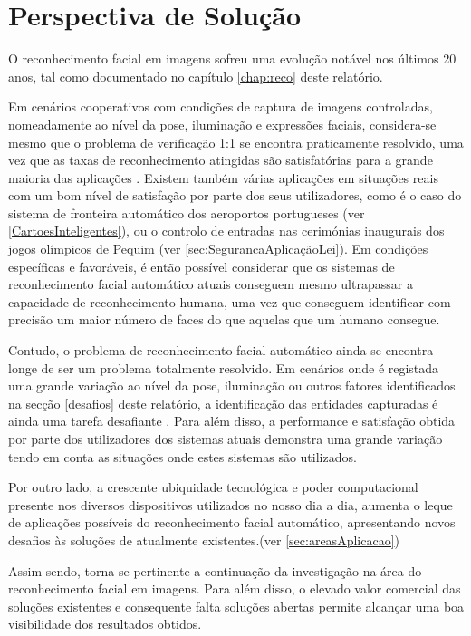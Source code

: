 \chapter{Perspectiva de Solução} \label{chap:solução}

O reconhecimento facial em imagens sofreu uma evolução notável nos últimos 20 anos, tal como documentado no capítulo \ref{chap:reco} deste relatório. 

Em cenários cooperativos com condições de captura de imagens controladas, nomeadamente ao nível da pose, iluminação e expressões faciais, considera-se mesmo que o problema de verificação 1:1 se encontra praticamente resolvido, uma vez que as taxas de reconhecimento atingidas são satisfatórias para a grande maioria das aplicações \citep{Li2011}. Existem também várias aplicações em situações reais com um bom nível de satisfação por parte dos seus utilizadores, como é o caso do sistema de fronteira automático dos aeroportos portugueses (ver \ref{CartoesInteligentes}), ou o controlo de entradas nas cerimónias inaugurais dos jogos olímpicos de Pequim (ver \ref{sec:SegurancaAplicaçãoLei}). Em condições específicas e favoráveis, é então possível considerar que os sistemas de reconhecimento facial automático atuais conseguem mesmo ultrapassar a capacidade de reconhecimento humana, uma vez que conseguem identificar com precisão um maior número de faces do que aquelas que um humano consegue.

Contudo, o problema de reconhecimento facial automático ainda se encontra longe de ser um problema totalmente resolvido. Em cenários onde é registada uma grande variação ao nível da pose, iluminação ou outros fatores identificados na secção \ref{desafios} deste relatório, a identificação das entidades capturadas é ainda uma tarefa desafiante  \citep{Li2011}. Para além disso, a performance e satisfação obtida por parte dos utilizadores dos sistemas atuais demonstra uma grande variação tendo em conta as situações onde estes sistemas são utilizados. 

Por outro lado, a crescente ubiquidade tecnológica e poder computacional presente nos diversos dispositivos utilizados no nosso dia a dia, aumenta o leque de aplicações possíveis do reconhecimento facial automático, apresentando novos desafios às soluções de atualmente existentes.(ver \ref{sec:areasAplicacao})

Assim sendo, torna-se pertinente a continuação da investigação na área do reconhecimento facial em imagens. Para além disso, o elevado valor comercial das soluções existentes e consequente falta soluções abertas permite alcançar uma boa visibilidade dos resultados obtidos.

